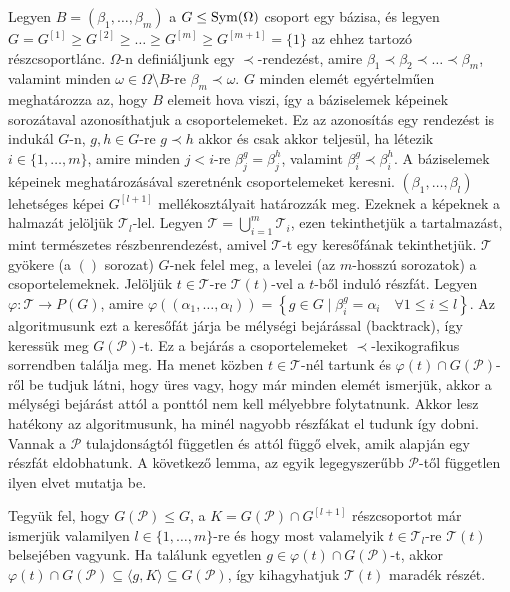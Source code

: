 Legyen $B=(\beta_1,\dots,\beta_m)$ a $G \le \operatorname{Sym}(\Omega)$ csoport egy bázisa, és legyen $G = G^{[1]} \ge G^{[2]} \ge \dots \ge G^{[m]} \ge G^{[m+1]} = \{1\}$ az ehhez tartozó részcsoportlánc.
$\Omega$-n definiáljunk egy $\prec$-rendezést, amire $\beta_1 \prec \beta_2 \prec \dots \prec \beta_m$, valamint minden $\omega \in \Omega \setminus B$-re $\beta_m \prec \omega$.
$G$ minden elemét egyértelműen meghatározza az, hogy $B$ elemeit hova viszi, így a báziselemek képeinek sorozátaval azonosíthatjuk a csoportelemeket.
Ez az azonosítás egy rendezést is indukál $G$-n, $g, h \in G$-re $g \prec h$ akkor és csak akkor teljesül, ha létezik $i \in \{1,\dots,m\}$, amire minden $j < i$-re $\beta_j^g = \beta_j^h$, valamint $\beta_i^g \prec \beta_i^h$.
A báziselemek képeinek meghatározásával szeretnénk csoportelemeket keresni.
$(\beta_1,\dots,\beta_l)$ lehetséges képei $G^{[l+1]}$ mellékosztályait határozzák meg.
Ezeknek a képeknek a halmazát jelöljük $\mathcal{T}_l$-lel.
Legyen $\mathcal{T} = \bigcup_{i=1}^m \mathcal{T}_i$, ezen tekinthetjük a tartalmazást, mint természetes részbenrendezést, amivel $\mathcal{T}$-t egy keresőfának tekinthetjük.
$\mathcal{T}$ gyökere (a $()$ sorozat) $G$-nek felel meg, a levelei (az $m$-hosszú sorozatok) a csoportelemeknek.
Jelöljük $t \in \mathcal{T}$-re $\mathcal{T}(t)$-vel a $t$-ből induló részfát.
Legyen $\varphi : \mathcal{T} \to P(G)$, amire $\varphi((\alpha_1,\dots,\alpha_l)) = \left\{ g \in G \mid \beta_i^g = \alpha_i \quad \forall 1 \le i \le l \right \}$.
Az algoritmusunk ezt a keresőfát járja be mélységi bejárással (backtrack), így keressük meg $G(\mathcal{P})$-t.
Ez a bejárás a csoportelemeket $\prec$-lexikografikus sorrendben találja meg.
Ha menet közben $t \in \mathcal{T}$-nél tartunk és $\varphi(t) \cap G(\mathcal{P})$-ről be tudjuk látni, hogy üres vagy, hogy már minden elemét ismerjük, akkor a mélységi bejárást attól a ponttól nem kell mélyebbre folytatnunk.
Akkor lesz hatékony az algoritmusunk, ha minél nagyobb részfákat el tudunk így dobni.
Vannak a $\mathcal{P}$ tulajdonságtól független és attól függő elvek, amik alapján egy részfát eldobhatunk.
A következő lemma, az egyik legegyszerűbb $\mathcal{P}$-től független ilyen elvet mutatja be.
\begin{lemma}
\label{thm:permbtcrit1}
Tegyük fel, hogy $G(\mathcal{P}) \le G$, a $K = G(\mathcal{P}) \cap G^{[l+1]}$ részcsoportot már ismerjük valamilyen $l \in \{1,\dots,m\}$-re és hogy most valamelyik $t \in \mathcal{T}_l$-re $\mathcal{T}(t)$ belsejében vagyunk.
Ha találunk egyetlen $g \in \varphi(t) \cap G(\mathcal{P})$-t, akkor $\varphi(t) \cap G(\mathcal{P}) \subseteq \langle g, K \rangle \subseteq G(\mathcal{P})$, így kihagyhatjuk $\mathcal{T}(t)$ maradék részét.
\end{lemma}
